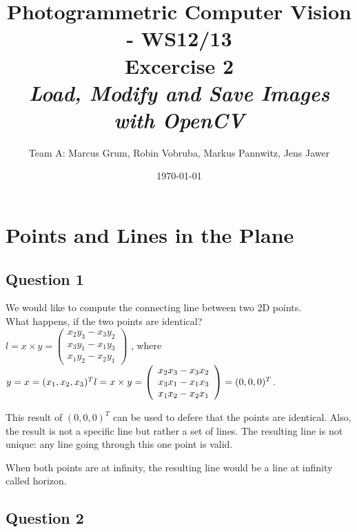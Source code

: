 \documentclass[a4paper,headings=small]{scrartcl}
\title{Photogrammetric Computer Vision - WS12/13 \\ Excercise 2 \\ \emph{Load, Modify and Save Images with OpenCV}}
\author{Team A: Marcus Grum, Robin Vobruba, Markus Pannwitz, Jens Jawer}
\date{\today}
\numberwithin{equation}{section} %
\numberwithin{figure}{section}   %
\begin{document}
\maketitle



\section{Points and Lines in the Plane}


\subsection{Question 1}


We would like to compute the connecting line between two 2D points. \\
What happens, if the two points are identical? \\

$l = x \times y =
\left( \begin{array}{c}
x_2 y_3 - x_3 y_2 \\
x_3 y_1 - x_1 y_3 \\
x_1 y_2 - x_2 y_1
\end{array} \right)$
, where $y = x = (x_1, x_2, x_3)^T \\
l = x \times y =
\left( \begin{array}{c}
x_2 x_3 - x_3 x_2\\
x_3 x_1 - x_1 x_3\\
x_1 x_2 - x_2 x_1\end{array} \right) = (0, 0, 0)^T$.

This result of $(0, 0, 0)^T$ can be used to defere that the points are identical.
Also, the result is not a specific line but rather a set of lines.
The resulting line is not unique:
any line going through this one point is valid.

When both points are at infinity, the resulting line would be a line at infinity called horizon.


\subsection{Question 2}
\end{document}
